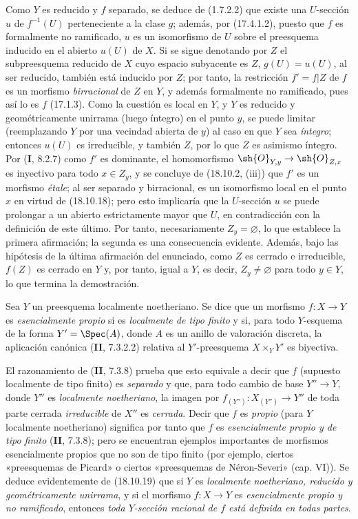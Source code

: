 Como $Y$ es reducido y $f$ separado, se deduce de (1.7.2.2) que existe una $U$-sección $u$ de $f^{-1}(U)$ perteneciente a la clase $g$; además, por (17.4.1.2), puesto que $f$ es formalmente no ramificado, $u$ es un isomorfismo de $U$ sobre el preesquema inducido en el abierto $u(U)$ de $X$. Si se sigue denotando por $Z$ el subpreesquema reducido de $X$ cuyo espacio subyacente es $Z$, $g(U)=u(U)$, al ser reducido, también está inducido por $Z$; por tanto, la restricción $f'=f|Z$ de $f$ es un morfismo \emph{birracional} de $Z$ en $Y$, y además formalmente no ramificado, pues así lo es $f$ (17.1.3). Como la cuestión es local en $Y$, y $Y$ es reducido y geométricamente unirrama (luego íntegro) en el punto $y$, se puede limitar (reemplazando $Y$ por una vecindad abierta de $y$) al caso en que $Y$ sea \emph{íntegro}; entonces $u(U)$ es irreducible, y también $Z$, por lo que $Z$ es asimismo íntegro. Por (\textbf I, 8.2.7) como $f'$ es dominante, el homomorfismo $\sh{O}_{Y,y}\to\sh{O}_{Z,x}$ es inyectivo para todo $x\in Z_y$, y se concluye de (18.10.2, (iii)) que $f'$ es un morfismo \emph{étale}; al ser separado y birracional, es un isomorfismo local en el punto $x$ en virtud de (18.10.18); pero esto implicaría que la $U$-sección $u$ se puede prolongar a un abierto estrictamente mayor que $U$, en contradicción con la definición de este último. Por tanto, necesariamente $Z_y=\varnothing$, lo que establece la primera afirmación; la segunda es una consecuencia evidente. Además, bajo las hipótesis de la última afirmación del enunciado, como $Z$ es cerrado e irreducible, $f(Z)$ es cerrado en $Y$ y, por tanto, igual a $Y$, es decir, $Z_y\ne\varnothing$ para todo $y\in Y$, lo que termina la demostración.

\begin{remark}[18.10.20]
\label{IV.18.10.20}
Sea $Y$ un preesquema localmente noetheriano. Se dice que un morfismo $f:X\to Y$ es \emph{esencialmente propio} si es \emph{localmente de tipo finito} y si, 
para todo $Y$-esquema de la forma $Y'=\Spec(A)$, donde $A$ es un anillo de valoración discreta, la aplicación canónica (\textbf{II}, 7.3.2.2) relativa al $Y'$-preesquema $X\times_Y Y'$ es biyectiva.



El razonamiento de (\textbf{II}, 7.3.8) prueba que esto equivale a decir que $f$ (supuesto localmente de tipo finito) es \emph{separado} y que, para todo cambio de base $Y''\to Y$, donde $Y''$ es \emph{localmente noetheriano}, la imagen por $f_{(Y'')}:X_{(Y'')}\to Y''$ de toda parte cerrada \emph{irreducible} de $X''$ es \emph{cerrada}. Decir que $f$ es \emph{propio} (para $Y$ localmente noetheriano) significa por tanto que $f$ es \emph{esencialmente propio y de tipo finito} (\textbf{II}, 7.3.8); pero se encuentran ejemplos importantes de morfismos esencialmente propios que no son de tipo finito (por ejemplo, ciertos «preesquemas de Picard» o ciertos «preesquemas de Néron-Severi» (cap. VI)). Se deduce evidentemente de (18.10.19) que si $Y$ es \emph{localmente noetheriano, reducido y geométricamente unirrama}, y si el morfismo $f:X\to Y$ es \emph{esencialmente propio y no ramificado}, entonces \emph{toda $Y$-sección racional de $f$ está definida en todas partes}.
\end{remark}

